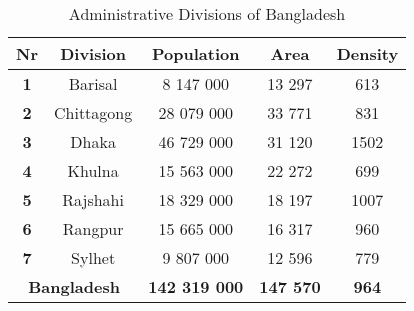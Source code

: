 \begin{table}[h]
\centering
\begin{tabular}{|cc|c|c|c|}
\hline
\multicolumn{1}{|c|}{\textbf{Nr}} & \textbf{Division}                 & \textbf{Population}  & \textbf{Area}    & \textbf{Density} \\ \hline
\multicolumn{1}{|c|}{\textbf{1}}  & {\color[HTML]{000000} Barisal}    & 8 147 000            & 13 297           & 613              \\ \hline
\multicolumn{1}{|c|}{\textbf{2}}  & {\color[HTML]{000000} Chittagong} & 28 079 000           & 33 771           & 831              \\ \hline
\multicolumn{1}{|c|}{\textbf{3}}  & {\color[HTML]{000000} Dhaka}      & 46 729 000           & 31 120           & 1502             \\ \hline
\multicolumn{1}{|c|}{\textbf{4}}  & {\color[HTML]{000000} Khulna}     & 15 563 000           & 22 272           & 699              \\ \hline
\multicolumn{1}{|c|}{\textbf{5}}  & {\color[HTML]{000000} Rajshahi}   & 18 329 000           & 18 197           & 1007             \\ \hline
\multicolumn{1}{|c|}{\textbf{6}}  & {\color[HTML]{000000} Rangpur}    & 15 665 000           & 16 317           & 960              \\ \hline
\multicolumn{1}{|c|}{\textbf{7}}  & {\color[HTML]{000000} Sylhet}     & 9 807 000            & 12 596           & 779              \\ \hline
\multicolumn{2}{|c|}{\textbf{Bangladesh}}                             & \textbf{142 319 000} & \textbf{147 570} & \textbf{964}     \\ \hline
\end{tabular}
\caption{Administrative Divisions of Bangladesh}
\label{tab:bang}
\end{table}